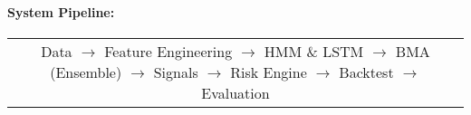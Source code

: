 \paragraph{System Pipeline:}
\begin{center}
\begin{tabular}{c}
Data $\rightarrow$ Feature Engineering $\rightarrow$ HMM \& LSTM $\rightarrow$ BMA (Ensemble) $\rightarrow$ Signals $\rightarrow$ Risk Engine $\rightarrow$ Backtest $\rightarrow$ Evaluation
\end{tabular}
\end{center}
